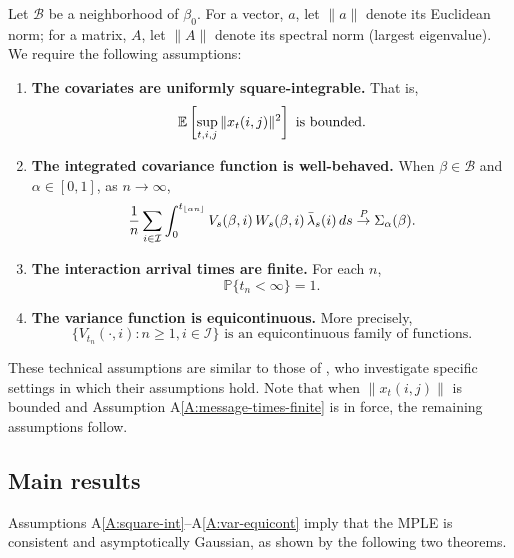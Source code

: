 \documentclass[final]{statsoc}
\begin{document}
Let $\mathcal{B}$ be a neighborhood of $\beta_0$.  For a vector, $a$, let
$\| a \|$ denote its Euclidean norm; for a matrix, $A$, let $\| A \|$ denote
its spectral norm (largest eigenvalue).  We require the following assumptions:
\begin{enumerate}[{A}1.]
    \item \label{A:square-int}
    \textbf{The covariates are uniformly square-integrable.}  That is,
    \[
        \mathbb{E}\left[
            \sup_{t, i, j} \| x_{t}(i,j) \|^2
        \right]
        \,\,\text{is bounded.}
    \]

    \item \label{A:integrated-cov-limit}
    \textbf{The integrated covariance function is well-behaved.}
    When $\beta \in \mathcal{B}$ and $\alpha \in [0,1]$, as $ n \to \infty$,
    \[
        \frac{1}{n}
        \sum_{i \in \mathcal{I}}
        \int_0^{t_{\lfloor \alpha n \rfloor}}
            V_s(\beta,i)
            \, W_s(\beta,i)
            \, \bar \lambda_s(i)
            \, ds
        \overset{\mathit{P}}{\to}
        \Sigma_\alpha(\beta).
    \]

    \item \label{A:message-times-finite}
    \textbf{The interaction arrival times are finite.}  For each $n$,
    \[
        \mathbb{P}\{t_n < \infty\} = 1.
    \]

    \item \label{A:var-equicont}
    \textbf{The variance function is equicontinuous.}
    More precisely,
    \[
        \Big\{
            V_{t_n}(\cdot, i)
            :
            n \geq 1, i \in \mathcal{I}
        \Big\}
        \,\,\text{is an equicontinuous family of functions.}
    \]
\end{enumerate}

These technical assumptions are similar to those of
\citet{andersen1982cox}, who investigate specific settings in which their
assumptions hold.  Note that when $\| x_t(i,j) \|$ is bounded and Assumption
A\ref{A:message-times-finite} is in force, the remaining assumptions follow.

\subsection{Main results}
Assumptions A\ref{A:square-int}--A\ref{A:var-equicont} imply that the MPLE is consistent and asymptotically
Gaussian, as shown by the following two theorems.
\end{document}

